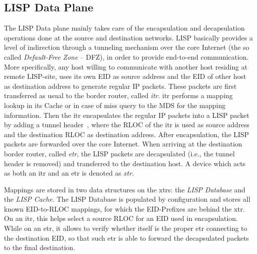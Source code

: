 \subsection{LISP Data Plane}
\label{sec:data_plane}
The LISP Data plane mainly takes care of the encapsulation and decapsulation operations done at the source and destination networks. LISP basically provides a level of indirection through a tunneling mechanism over the core Internet (the so called \emph{Default-Free Zone} -- DFZ), in order to provide end-to-end communication. More specifically, any host willing to communicate with another host residing at remote LISP-site, uses its own EID as source address and the EID of other host as destination address to generate regular IP packets. These packets are first transferred as usual to the border router, called \emph{\acrfull{itr}}. \acrshort{itr} performs a mapping lookup in its Cache or in case of miss query to the MDS for the mapping information. Then the \acrshort{itr} encapsulates the regular IP packets into a LISP packet by adding a tunnel header~\cite{rfc6830}, where the RLOC of the \acrshort{itr} is used as source address and the destination RLOC as destination address. After encapsulation, the LISP packets are forwarded over the core Internet. When arriving at the destination border router, called \emph{\acrfull{etr}}, the LISP packets are decapsulated (i.e., the tunnel header is removed) and transferred to the destination host. A device which acts as both an \acrshort{itr} and an \acrshort{etr} is denoted as \emph{\acrshort{xtr}}.

Mappings are stored in two data structures on the \acrshort{xtr}s: the \emph{LISP Database} and the \emph{LISP Cache}. The LISP Database is populated by configuration and stores all known EID-to-RLOC mappings, for which the EID-Prefixes are behind the \acrshort{xtr}. On an \acrshort{itr}, this helps select a source RLOC for an EID used in encapsulation. While on an \acrshort{etr}, it allows to verify whether itself is the proper \acrshort{etr} connecting to the destination EID, so that such \acrshort{etr} is able to forward the decapsulated packets to the final destination. 

